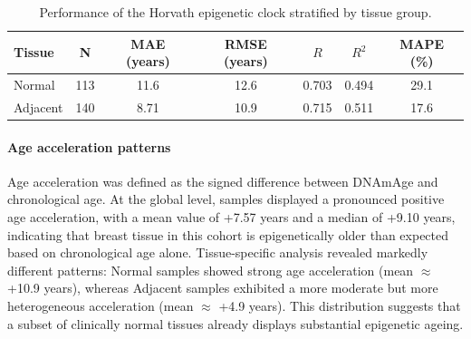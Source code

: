 \documentclass[10pt]{extarticle}
\begin{document}
\begin{table}[t]
\centering
\caption{Performance of the Horvath epigenetic clock stratified by tissue group.}
\label{tab:horvath_by_tissue}
\begin{tabular}{l c c c c c c}
\toprule
Tissue & N & MAE (years) & RMSE (years) & $R$ & $R^2$ & MAPE (\%) \\
\midrule
Normal & 113 & 11.6 & 12.6 & 0.703 & 0.494 & 29.1 \\
Adjacent & 140 & 8.71 & 10.9 & 0.715 & 0.511 & 17.6 \\
\bottomrule
\end{tabular}
\end{table}

\paragraph{Age acceleration patterns}
Age acceleration was defined as the signed difference between DNAmAge and chronological age. At the global level, samples displayed a pronounced positive age acceleration, with a mean value of +7.57 years and a median of +9.10 years, indicating that breast tissue in this cohort is epigenetically older than expected based on chronological age alone. Tissue-specific analysis revealed markedly different patterns: Normal samples showed strong age acceleration (mean $\approx$ +10.9 years), whereas Adjacent samples exhibited a more moderate but more heterogeneous acceleration (mean $\approx$ +4.9 years). This distribution suggests that a subset of clinically normal tissues already displays substantial epigenetic ageing.
\end{document}
